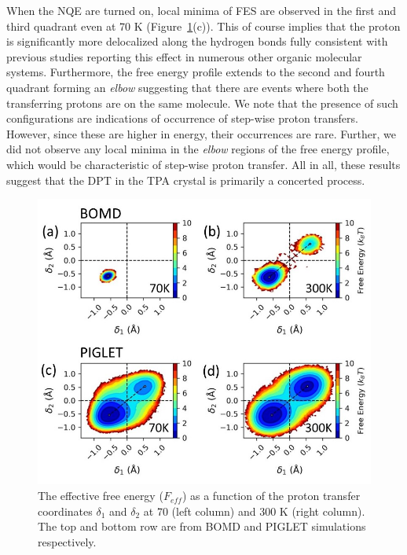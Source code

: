 When the NQE are turned on, local minima of FES are observed in the first and third 
quadrant even at 70 K (Figure~\ref{fig:delta1_delta2}(c)). This of course implies that the proton is significantly more delocalized along the hydrogen bonds fully consistent with previous studies reporting this effect in numerous other organic molecular systems\cite{fang2016inverse,li2011quantum,wang2014quantum,ivanov2015quantum,wikfeldt2014communication,litman2019elucidating,sappati2016nuclear,rossi2016anharmonic,pinotsi2016proton,law2015role,tuckerman1997quantum}. Furthermore, the free energy profile extends to the second and 
fourth quadrant forming an \emph{elbow} suggesting that there are events where both the transferring 
protons are on the same molecule. We note that the presence of such configurations
are indications of occurrence of step-wise proton transfers. However,
since these are higher in energy, their occurrences are rare. Further,
we did not observe any local minima in the \emph{elbow} regions of the free energy profile, which would be
characteristic of step-wise proton transfer. All in all, these results suggest that the DPT in the TPA crystal is primarily a concerted process.

\begin{figure}
\centering
\includegraphics[width=14cm ]{./Chapter1/new_figures/prob_delta1_delta2.jpg}
\caption{The effective free energy ($F_{eff}$) as a function of the proton transfer
coordinates $\delta_1$ and $\delta_2$ at
70 (left column) and 300 K (right column). The top and bottom row are
from BOMD and PIGLET simulations respectively.}
\label{fig:delta1_delta2}
\end{figure}

